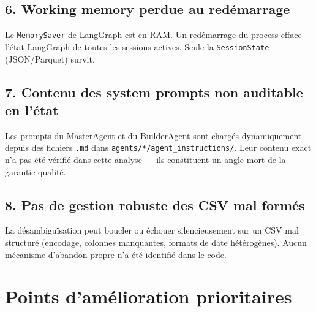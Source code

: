 \documentclass[12pt,a4paper]{article}
\begin{document}
\begin{limitbox}
\subsection*{6. Working memory perdue au redémarrage}
Le \texttt{MemorySaver} de LangGraph est en RAM. Un redémarrage du process efface
l'état LangGraph de toutes les sessions actives. Seule la \texttt{SessionState}
(JSON/Parquet) survit.

\subsection*{7. Contenu des system prompts non auditable en l'état}
Les prompts du MasterAgent et du BuilderAgent sont chargés dynamiquement depuis
des fichiers \texttt{.md} dans \texttt{agents/*/agent\_instructions/}. Leur contenu
exact n'a pas été vérifié dans cette analyse — ils constituent un angle mort
de la garantie qualité.

\subsection*{8. Pas de gestion robuste des CSV mal formés}
La désambiguïsation peut boucler ou échouer silencieusement sur un CSV mal structuré
(encodage, colonnes manquantes, formats de date hétérogènes). Aucun mécanisme
d'abandon propre n'a été identifié dans le code.

\end{limitbox}

\newpage

\section{Points d'amélioration prioritaires}
\end{document}
